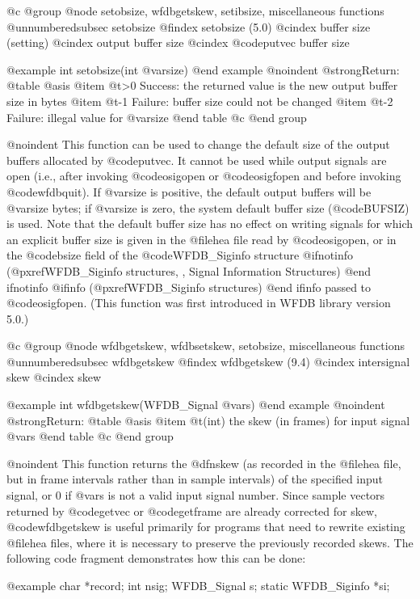 {{{{{{{{{@c @group
@node     setobsize, wfdbgetskew, setibsize, miscellaneous functions
@unnumberedsubsec setobsize
@findex setobsize (5.0)
@cindex buffer size (setting)
@cindex output buffer size
@cindex @code{putvec} buffer size

@example
int setobsize(int @var{size})
@end example
@noindent
@strong{Return:}
@table @asis
@item @t{>0}
Success: the returned value is the new output buffer size in bytes
@item @t{-1}
Failure: buffer size could not be changed
@item @t{-2}
Failure: illegal value for @var{size}
@end table
@c @end group

@noindent
This function can be used to change the default size of the output
buffers allocated by @code{putvec}.  It cannot be used while output
signals are open (i.e., after invoking @code{osigopen} or
@code{osigfopen} and before invoking @code{wfdbquit}).  If @var{size} is
positive, the default output buffers will be @var{size} bytes; if
@var{size} is zero, the system default buffer size (@code{BUFSIZ}) is
used.  Note that the default buffer size has no effect on writing
signals for which an explicit buffer size is given in the @file{hea}
file read by @code{osigopen}, or in the @code{bsize} field of the
@code{WFDB_Siginfo} structure
@ifnotinfo
(@pxref{WFDB_Siginfo structures, , Signal Information Structures})
@end ifnotinfo
@ifinfo
(@pxref{WFDB_Siginfo structures})
@end ifinfo
passed to @code{osigfopen}.
(This function was first introduced in WFDB library version 5.0.)

@c @group
@node     wfdbgetskew, wfdbsetskew, setobsize, miscellaneous functions
@unnumberedsubsec wfdbgetskew
@findex wfdbgetskew (9.4)
@cindex intersignal skew
@cindex skew

@example
int wfdbgetskew(WFDB_Signal @var{s})
@end example
@noindent
@strong{Return:}
@table @asis
@item @t{(int)}
the skew (in frames) for input signal @var{s}
@end table
@c @end group

@noindent
This function returns the @dfn{skew} (as recorded in the @file{hea}
file, but in frame intervals rather than in sample intervals) of the
specified input signal, or 0 if @var{s} is not a valid input signal
number.  Since sample vectors returned by @code{getvec} or
@code{getframe} are already corrected for skew, @code{wfdbgetskew} is
useful primarily for programs that need to rewrite existing
@file{hea} files, where it is necessary to preserve the previously
recorded skews.  The following code fragment demonstrates how this can
be done:

@example
char *record;
int nsig;
WFDB_Signal s;
static WFDB_Siginfo *si;

}}}}}}}}}
